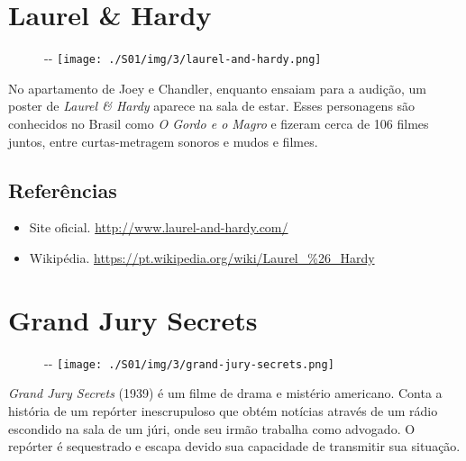\hypertarget{laurel-hardy}{%
\section{Laurel \& Hardy}\label{laurel-hardy}}

\begin{figure}[!ht]
  \begin{adjustwidth}{-\oddsidemargin-1in}{-\rightmargin}
    \centering
    \texttt{[image: ./S01/img/3/laurel-and-hardy.png]}
  \end{adjustwidth}
\end{figure}

No apartamento de Joey e Chandler, enquanto ensaiam para a audição, um
poster de \emph{Laurel \& Hardy} aparece na sala de estar. Esses
personagens são conhecidos no Brasil como \emph{O Gordo e o Magro} e
fizeram cerca de 106 filmes juntos, entre curtas-metragem sonoros e
mudos e filmes.

\hypertarget{referuxeancias}{%
\subsection{Referências}\label{referuxeancias}}

\begin{itemize}
\tightlist
\item
  \sloppy Site oficial. \url{http://www.laurel-and-hardy.com/}
\item
  \sloppy Wikipédia. \url{https://pt.wikipedia.org/wiki/Laurel_%26_Hardy}
\end{itemize}

\hypertarget{grand-jury-secrets}{%
\section{Grand Jury Secrets}\label{grand-jury-secrets}}

\begin{figure}[!ht]
  \begin{adjustwidth}{-\oddsidemargin-1in}{-\rightmargin}
    \centering
    \texttt{[image: ./S01/img/3/grand-jury-secrets.png]}
  \end{adjustwidth}
\end{figure}

\emph{Grand Jury Secrets} (1939) é um filme de drama e mistério
americano. Conta a história de um repórter inescrupuloso que obtém
notícias através de um rádio escondido na sala de um júri, onde seu
irmão trabalha como advogado. O repórter é sequestrado e escapa devido
sua capacidade de transmitir sua situação.

